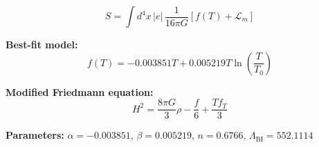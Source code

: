 
\begin{equation}
  S = \int d^4x \, |e| \, \frac{1}{16\pi G} \left[ f(T) + \mathcal{L}_m \right]
\end{equation}

\textbf{Best-fit model:}
\begin{equation}
  f(T) = -0.003851 T + 0.005219 T \ln\!\left(\frac{T}{T_0}\right)
\end{equation}

\textbf{Modified Friedmann equation:}
\begin{equation}
  H^2 = \frac{8\pi G}{3} \rho - \frac{f}{6} + \frac{T f_T}{3}
\end{equation}

\textbf{Parameters:}
$\alpha = -0.003851$, \quad
$\beta = 0.005219$, \quad
$n = 0.6766$, \quad
$\Lambda_{\text{BI}} = 552.1114$